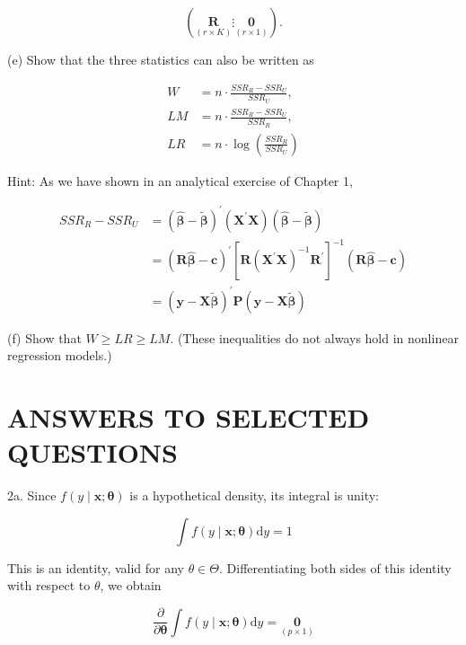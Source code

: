 \documentclass[10pt]{article}
\begin{document}
$$
(\underset{(r \times K)}{\mathbf{R}} \vdots \underset{(r \times 1)}{\mathbf{0}}) .
$$

(e) Show that the three statistics can also be written as

$$
\begin{aligned}
W & =n \cdot \frac{S S R_{R}-S S R_{U}}{S S R_{U}}, \\
L M & =n \cdot \frac{S S R_{R}-S S R_{U}}{S S R_{R}}, \\
L R & =n \cdot \log \left(\frac{S S R_{R}}{S S R_{U}}\right)
\end{aligned}
$$

Hint: As we have shown in an analytical exercise of Chapter 1,

$$
\begin{aligned}
S S R_{R}-S S R_{U} & =(\widehat{\boldsymbol{\beta}}-\widetilde{\boldsymbol{\beta}})^{\prime}\left(\mathbf{X}^{\prime} \mathbf{X}\right)(\widehat{\boldsymbol{\beta}}-\widetilde{\boldsymbol{\beta}}) \\
& =(\mathbf{R} \widehat{\boldsymbol{\beta}}-\mathbf{c})^{\prime}\left[\mathbf{R}\left(\mathbf{X}^{\prime} \mathbf{X}\right)^{-1} \mathbf{R}^{\prime}\right]^{-1}(\mathbf{R} \widehat{\boldsymbol{\beta}}-\mathbf{c}) \\
& =(\mathbf{y}-\mathbf{X} \widetilde{\boldsymbol{\beta}})^{\prime} \mathbf{P}(\mathbf{y}-\mathbf{X} \widetilde{\boldsymbol{\beta}})
\end{aligned}
$$

(f) Show that $W \geq L R \geq L M$. (These inequalities do not always hold in nonlinear regression models.)

\section*{ANSWERS TO SELECTED QUESTIONS}
2a. Since $f(y \mid \mathbf{x} ; \boldsymbol{\theta})$ is a hypothetical density, its integral is unity:


\begin{equation*}
\int f(y \mid \mathbf{x} ; \boldsymbol{\theta}) \mathrm{d} y=1 \tag{1}
\end{equation*}


This is an identity, valid for any $\theta \in \Theta$. Differentiating both sides of this identity with respect to $\theta$, we obtain


\begin{equation*}
\frac{\partial}{\partial \boldsymbol{\theta}} \int f(y \mid \mathbf{x} ; \boldsymbol{\theta}) \mathrm{d} y=\underset{(p \times 1)}{\mathbf{0}} \tag{2}
\end{equation*}
\end{document}
